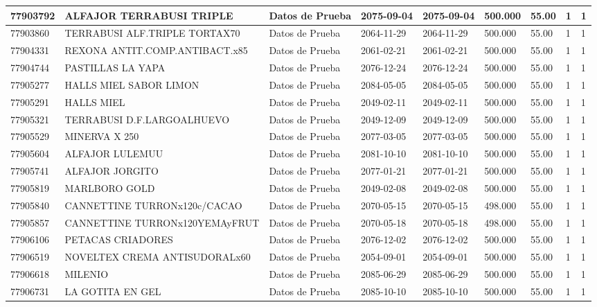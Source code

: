 \documentclass[a4paper,12pt]{article}
\begin{document}
\begin{landscape}
\begin{longtable}{|p{4cm}|p{2.5cm}|p{2.5cm}|p{1.8cm}|p{1.8cm}|p{1cm}|p{1cm}|p{3cm}|p{3cm}||}
77903792 & ALFAJOR TERRABUSI TRIPLE & Datos de Prueba & 2075-09-04 & 2075-09-04 & 500.000 & 55.00 & 1 & 1 \\ \hline 
77903860 & TERRABUSI ALF.TRIPLE TORTAX70 & Datos de Prueba & 2064-11-29 & 2064-11-29 & 500.000 & 55.00 & 1 & 1 \\ \hline 
77904331 & REXONA ANTIT.COMP.ANTIBACT.x85 & Datos de Prueba & 2061-02-21 & 2061-02-21 & 500.000 & 55.00 & 1 & 1 \\ \hline 
77904744 & PASTILLAS LA YAPA & Datos de Prueba & 2076-12-24 & 2076-12-24 & 500.000 & 55.00 & 1 & 1 \\ \hline 
77905277 & HALLS MIEL SABOR LIMON & Datos de Prueba & 2084-05-05 & 2084-05-05 & 500.000 & 55.00 & 1 & 1 \\ \hline 
77905291 & HALLS MIEL & Datos de Prueba & 2049-02-11 & 2049-02-11 & 500.000 & 55.00 & 1 & 1 \\ \hline 
77905321 & TERRABUSI D.F.LARGOALHUEVO & Datos de Prueba & 2049-12-09 & 2049-12-09 & 500.000 & 55.00 & 1 & 1 \\ \hline 
77905529 & MINERVA X 250 & Datos de Prueba & 2077-03-05 & 2077-03-05 & 500.000 & 55.00 & 1 & 1 \\ \hline 
77905604 & ALFAJOR LULEMUU & Datos de Prueba & 2081-10-10 & 2081-10-10 & 500.000 & 55.00 & 1 & 1 \\ \hline 
77905741 & ALFAJOR JORGITO & Datos de Prueba & 2077-01-21 & 2077-01-21 & 500.000 & 55.00 & 1 & 1 \\ \hline 
77905819 & MARLBORO GOLD & Datos de Prueba & 2049-02-08 & 2049-02-08 & 500.000 & 55.00 & 1 & 1 \\ \hline 
77905840 & CANNETTINE TURRONx120c/CACAO & Datos de Prueba & 2070-05-15 & 2070-05-15 & 498.000 & 55.00 & 1 & 1 \\ \hline 
77905857 & CANNETTINE TURRONx120YEMAyFRUT & Datos de Prueba & 2070-05-18 & 2070-05-18 & 498.000 & 55.00 & 1 & 1 \\ \hline 
77906106 & PETACAS CRIADORES & Datos de Prueba & 2076-12-02 & 2076-12-02 & 500.000 & 55.00 & 1 & 1 \\ \hline 
77906519 & NOVELTEX CREMA ANTISUDORALx60 & Datos de Prueba & 2054-09-01 & 2054-09-01 & 500.000 & 55.00 & 1 & 1 \\ \hline 
77906618 & MILENIO & Datos de Prueba & 2085-06-29 & 2085-06-29 & 500.000 & 55.00 & 1 & 1 \\ \hline 
77906731 & LA   GOTITA EN GEL & Datos de Prueba & 2085-10-10 & 2085-10-10 & 500.000 & 55.00 & 1 & 1 \\ \hline 

\end{longtable}
\end{landscape}
\end{document}
